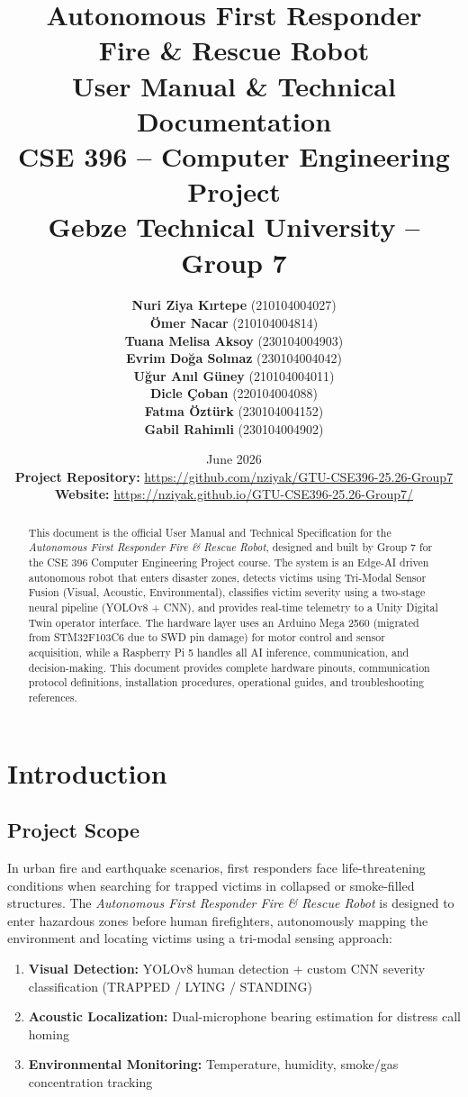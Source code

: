 \documentclass[11pt,a4paper]{article}
\title{\textbf{Autonomous First Responder\\Fire \& Rescue Robot\\User Manual \& Technical Documentation}\\\vspace{0.5em}\large CSE 396 -- Computer Engineering Project\\\large Gebze Technical University -- Group 7}
\author{
  \textbf{Nuri Ziya Kırtepe} (210104004027) \\
  \textbf{Ömer Nacar} (210104004814) \\
  \textbf{Tuana Melisa Aksoy} (230104004903) \\
  \textbf{Evrim Doğa Solmaz} (230104004042) \\
  \textbf{Uğur Anıl Güney} (210104004011) \\
  \textbf{Dicle Çoban} (220104004088) \\
  \textbf{Fatma Öztürk} (230104004152) \\
  \textbf{Gabil Rahimli} (230104004902)
}
\date{June 2026 \\ \vspace{1.5em} \textbf{Project Repository:} \url{https://github.com/nziyak/GTU-CSE396-25.26-Group7} \\ \textbf{Website:} \url{https://nziyak.github.io/GTU-CSE396-25.26-Group7/}}
\begin{document}
\maketitle

\begin{abstract}
This document is the official User Manual and Technical Specification for the \textit{Autonomous First Responder Fire \& Rescue Robot}, designed and built by Group 7 for the CSE 396 Computer Engineering Project course. The system is an Edge-AI driven autonomous robot that enters disaster zones, detects victims using Tri-Modal Sensor Fusion (Visual, Acoustic, Environmental), classifies victim severity using a two-stage neural pipeline (YOLOv8 + CNN), and provides real-time telemetry to a Unity Digital Twin operator interface. The hardware layer uses an Arduino Mega 2560 (migrated from STM32F103C6 due to SWD pin damage) for motor control and sensor acquisition, while a Raspberry Pi 5 handles all AI inference, communication, and decision-making. This document provides complete hardware pinouts, communication protocol definitions, installation procedures, operational guides, and troubleshooting references.
\end{abstract}

\newpage
\tableofcontents
\newpage

\section{Introduction}
\subsection{Project Scope}
In urban fire and earthquake scenarios, first responders face life-threatening conditions when searching for trapped victims in collapsed or smoke-filled structures. The \textit{Autonomous First Responder Fire \& Rescue Robot} is designed to enter hazardous zones before human firefighters, autonomously mapping the environment and locating victims using a tri-modal sensing approach:

\begin{enumerate}
    \item \textbf{Visual Detection:} YOLOv8 human detection + custom CNN severity classification (TRAPPED / LYING / STANDING)
    \item \textbf{Acoustic Localization:} Dual-microphone bearing estimation for distress call homing
    \item \textbf{Environmental Monitoring:} Temperature, humidity, smoke/gas concentration tracking
\end{enumerate}
\end{document}

